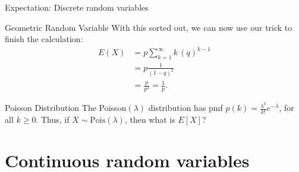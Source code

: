 \begin{frame}[allowframebreaks]{Expectation: Discrete random variables}
\begin{exampleblock}{Geometric Random Variable}
{  With this sorted out, we can now use our trick to finish the calculation:
  \begin{align*}
    E(X) &= p \sum_{k = 1}^{\infty} k \, (q)^{k-1} \\
         &= p\frac{1}{(1 - q)^2} \\
         &= \frac{p}{p^2} = \frac{1}{p}.
  \end{align*}
  }
  \end{exampleblock}
  
  
  \framebreak
  
  \begin{exampleblock}{Poisson Distribution}
    The Poisson$(\lambda)$ distribution has pmf $p(k) = \frac{\lambda^k}{k!}e^{-\lambda}$, for all $k \geq 0$. Thus, if $X \sim \text{Pois}(\lambda)$, then what is $E[X]$? 
  \end{exampleblock}
  
  
  \end{frame}

\section{Continuous random variables}

